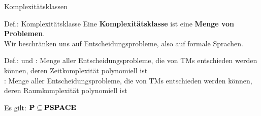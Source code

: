 \begin{frame}{Komplexitätsklassen}
    \begin{block}{Def.: Komplexitätsklasse}
        Eine \textbf{Komplexitätsklasse} ist eine \textbf{Menge von Problemen}.\\
        Wir beschränken uns auf Entscheidungsprobleme, also auf formale Sprachen.
    \end{block}

    \begin{block}{Def.: \Pclass und \PSPACE}
        \Pclass: Menge aller Entscheidungsprobleme, die von TMs entschieden werden können, deren Zeitkomplexität polynomiell ist\\[1ex]
        \PSPACE: Menge aller Entscheidungsprobleme, die von TMs entschieden werden können, deren Raumkomplexität polynomiell ist 
    \end{block}

    Es gilt: $\text{\bfseries P} \subseteq \text{\bfseries PSPACE}$
\end{frame}